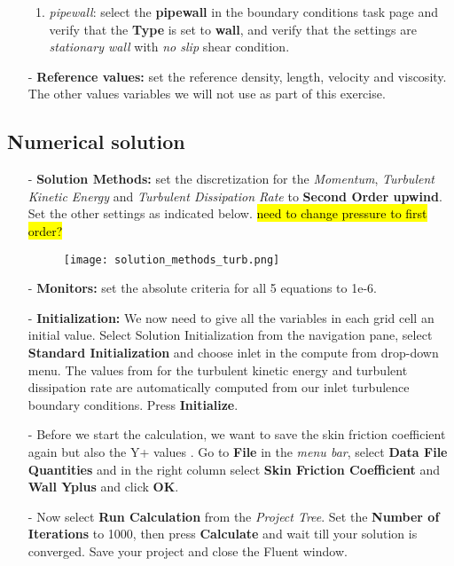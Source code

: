 \documentclass[11pt,a4paper,oneside]{scrartcl}
\newcommand\bfr[1]{\textcolor[rgb]{1,0.00,0.00}{\textbf{\textsf{#1}}}}
\begin{document}
\begin{itemize}
\begin{enumerate}
        \item \emph{pipewall}: select the \bfr{pipewall} in the boundary conditions task page and verify that the \bfr{Type} is set to \bfr{wall}, and verify that the settings are \emph{stationary wall} with \emph{no slip }shear condition.
    \end{enumerate}
    \item[-] \textbf{Reference values: } set the reference density, length, velocity and viscosity. The other values variables we will not use as part of this exercise.
\end{itemize}

\subsection{Numerical solution}

\begin{itemize}
    \item[-] \textbf{Solution Methods:} set the discretization for the \emph{Momentum}, \emph{Turbulent Kinetic Energy} and \emph{Turbulent Dissipation Rate} to \bfr{Second Order upwind}. Set the other settings as indicated below. \hl{need to change pressure to first order?}
            \begin{figure}[H]
            \begin{center}
            \texttt{[image: solution\_methods\_turb.png]}
            \end{center}
            \end{figure}
    \item[-] \textbf{Monitors:} set the absolute criteria for all 5 equations to 1e-6.
    \item[-] \textbf{Initialization:} We now need to give all the variables in each grid cell an initial value. Select Solution Initialization from the navigation pane, select \bfr{Standard Initialization} and choose inlet in the compute
                from drop-down menu. The values from for the turbulent kinetic energy and turbulent dissipation rate are automatically computed from our inlet turbulence boundary conditions. Press \bfr{Initialize}.
    \item[-] Before we start the calculation, we want to save the skin friction coefficient again but also the Y+ values . Go to \bfr{File} in the \emph{menu bar}, select \bfr{Data File Quantities} and in the right column select \bfr{Skin Friction Coefficient} and \bfr{Wall Yplus} and click \bfr{OK}.
    \item[-] Now select \bfr{Run Calculation} from the \emph{Project Tree}. Set the \bfr{Number of Iterations} to 1000, then press \bfr{Calculate} and wait till your solution is converged. Save your project and close the Fluent window.
\end{itemize}
\end{document}
